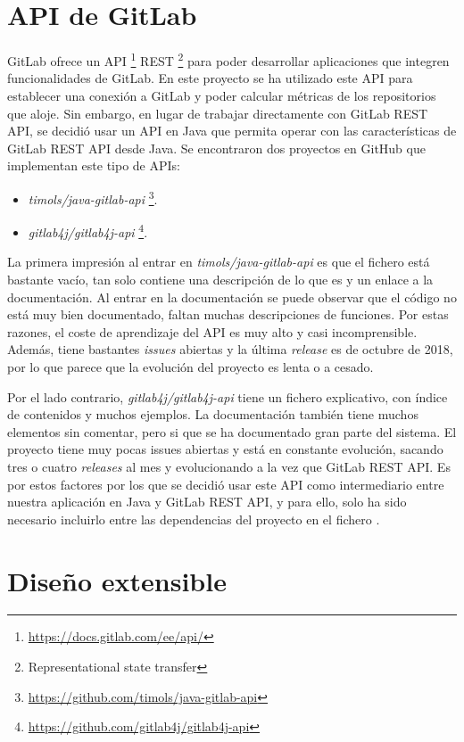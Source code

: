 \section{API de GitLab}

GitLab ofrece un API \footnote{\url{https://docs.gitlab.com/ee/api/}} REST \footnote{Representational state transfer} para poder desarrollar aplicaciones que integren funcionalidades de GitLab. En este proyecto se ha utilizado este API para establecer una conexión a GitLab y poder calcular métricas de los repositorios que aloje. Sin embargo, en lugar de trabajar directamente con GitLab REST API, se decidió usar un API en Java que permita operar con las características de GitLab REST API desde Java. Se encontraron dos proyectos en GitHub que implementan este tipo de APIs:
\begin{itemize}
	\tightlist
	\item \textit{timols/java-gitlab-api} \footnote{\url{https://github.com/timols/java-gitlab-api}}. 
	\item  \textit{gitlab4j/gitlab4j-api} \footnote{\url{https://github.com/gitlab4j/gitlab4j-api}}.
\end{itemize}

La primera impresión al entrar en \textit{timols/java-gitlab-api} es que el fichero  está bastante vacío, tan solo contiene una descripción de lo que es y un enlace a la documentación. Al entrar en la documentación se puede observar que el código no está muy bien documentado, faltan muchas descripciones de funciones. Por estas razones, el coste de aprendizaje del API es muy alto y casi incomprensible. Además, tiene bastantes \textit{issues} abiertas y la última \textit{release} es de octubre de 2018, por lo que parece que la evolución del proyecto es lenta o a cesado.

Por el lado contrario, \textit{gitlab4j/gitlab4j-api} tiene un fichero  explicativo, con índice de contenidos y muchos ejemplos. La documentación también tiene muchos elementos sin comentar, pero si que se ha documentado gran parte del sistema. El proyecto tiene muy pocas issues abiertas y está en constante evolución, sacando tres o cuatro \textit{releases} al mes y evolucionando a la vez que GitLab REST API. Es por estos factores por los que se decidió usar este API como intermediario entre nuestra aplicación en Java y GitLab REST API, y para ello, solo ha sido necesario incluirlo entre las dependencias del proyecto en el fichero . 

\section{Diseño extensible}

